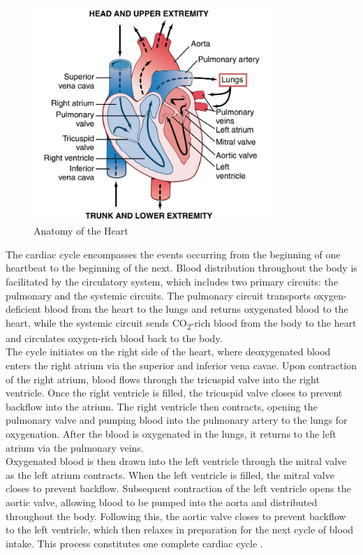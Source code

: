 \begin{figure}[tb]
	\centering
	\includegraphics[width=0.8\textwidth]{images/anatomy of heart}
	\caption{Anatomy of the Heart~\cite{hall2015}}
	\label{fig:heart_anatomy}
\end{figure}


\noindent The cardiac cycle encompasses the events occurring from the beginning of one heartbeat to the beginning of the next. Blood distribution throughout the body is facilitated by the circulatory system, which includes two primary circuits: the pulmonary and the systemic circuits. The pulmonary circuit transports oxygen-deficient blood from the heart to the lungs and returns oxygenated blood to the heart, while the systemic circuit sends CO\textsubscript{2}-rich blood from the body to the heart and circulates oxygen-rich blood back to the body.\\

\noindent The cycle initiates on the right side of the heart, where deoxygenated blood enters the right atrium via the superior and inferior vena cavae. Upon contraction of the right atrium, blood flows through the tricuspid valve into the right ventricle. Once the right ventricle is filled, the tricuspid valve closes to prevent backflow into the atrium. The right ventricle then contracts, opening the pulmonary valve and pumping blood into the pulmonary artery to the lungs for oxygenation. After the blood is oxygenated in the lungs, it returns to the left atrium via the pulmonary veins.\\

\noindent Oxygenated blood is then drawn into the left ventricle through the mitral valve as the left atrium contracts. When the left ventricle is filled, the mitral valve closes to prevent backflow. Subsequent contraction of the left ventricle opens the aortic valve, allowing blood to be pumped into the aorta and distributed throughout the body. Following this, the aortic valve closes to prevent backflow to the left ventricle, which then relaxes in preparation for the next cycle of blood intake. This process constitutes one complete cardiac cycle \cite{hall2015, malminen1995}.



